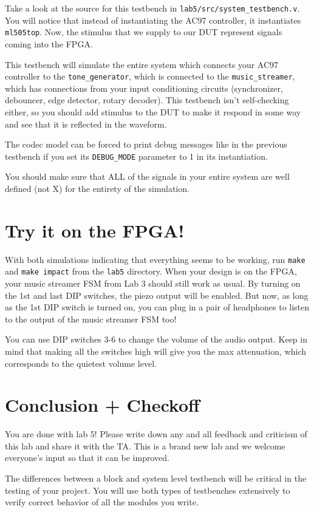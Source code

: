 \documentclass[11pt]{article}
\begin{document}
Take a look at the source for this testbench in \verb|lab5/src/system_testbench.v|. You will notice that instead of instantiating the AC97 controller, it instantiates \verb|ml505top|. Now, the stimulus that we supply to our DUT represent signals coming into the FPGA.

This testbench will simulate the entire system which connects your AC97 controller to the \verb|tone_generator|, which is connected to the \verb|music_streamer|, which has connections from your input conditioning circuits (synchronizer, debouncer, edge detector, rotary decoder). This testbench isn't self-checking either, so you should add stimulus to the DUT to make it respond in some way and see that it is reflected in the waveform.

The codec model can be forced to print debug messages like in the previous testbench if you set its \verb|DEBUG_MODE| parameter to 1 in its instantiation.

You should make sure that ALL of the signals in your entire system are well defined (not X) for the entirety of the simulation.

\section{Try it on the FPGA!}
With both simulations indicating that everything seems to be working, run \verb|make| and \verb|make impact| from the \verb|lab5| directory. When your design is on the FPGA, your music streamer FSM from Lab 3 should still work as usual. By turning on the 1st and last DIP switches, the piezo output will be enabled. But now, as long as the 1st DIP switch is turned on, you can plug in a pair of headphones to listen to the output of the music streamer FSM too!

You can use DIP switches 3-6 to change the volume of the audio output. Keep in mind that making all the switches high will give you the max attenuation, which corresponds to the quietest volume level.

\section{Conclusion + Checkoff}
You are done with lab 5! Please write down any and all feedback and criticism of this lab and share it with the TA. This is a brand new lab and we welcome everyone's input so that it can be improved.

The differences between a block and system level testbench will be critical in the testing of your project. You will use both types of testbenches extensively to verify correct behavior of all the modules you write.
\end{document}
